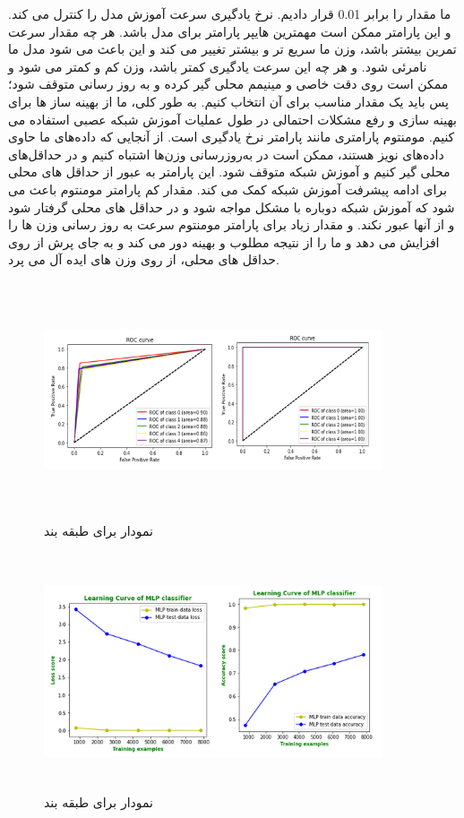\documentclass[12pt,onecolumn,a4paper]{article}
\begin{document}
ما مقدار  را برابر 0.01 قرار دادیم. نرخ یادگیری سرعت آموزش مدل را کنترل می کند. و این پارامتر ممکن است مهمترین هایپر پارامتر برای مدل باشد. هر چه مقدار  سرعت تمرین بیشتر باشد، وزن ما سریع تر و بیشتر تغییر می کند و این باعث می شود مدل ما نامرئی شود. و هر چه این سرعت یادگیری کمتر باشد، وزن کم و کمتر می شود و ممکن است روی دقت خاصی و مینیمم محلی گیر کرده و به روز رسانی متوقف شود؛ پس باید یک مقدار مناسب برای آن انتخاب کنیم.
به طور کلی، ما از بهینه ساز ها برای بهینه سازی و رفع مشکلات احتمالی در طول عملیات آموزش شبکه عصبی استفاده می کنیم. مومنتوم پارامتری مانند پارامتر نرخ یادگیری است.
از آنجایی که داده‌های ما حاوی داده‌های نویز هستند، ممکن است در به‌روزرسانی وزن‌ها اشتباه کنیم و در حداقل‌های محلی گیر کنیم و آموزش شبکه متوقف شود. این پارامتر به عبور از حداقل های محلی برای ادامه پیشرفت آموزش شبکه کمک می کند. مقدار کم پارامتر مومنتوم باعث می شود که آموزش شبکه دوباره با مشکل مواجه شود و در حداقل های محلی گرفتار شود و از آنها عبور نکند. و مقدار زیاد برای پارامتر مومنتوم سرعت به روز رسانی وزن ها را افزایش می دهد و ما را از نتیجه مطلوب و بهینه دور می کند و به جای پرش از روی حداقل های محلی، از روی وزن های ایده آل می پرد.


\begin{figure}
  \centering
  \includegraphics[width=10cm,height=7cm,keepaspectratio]{15.png}
  \caption{نمودار  برای طبقه بند }
  \label{fig:ROCMLP}
\end{figure}

\begin{figure}
  \centering
  \includegraphics[width=10cm,height=7cm,keepaspectratio]{16.png}
  \caption{نمودار  برای طبقه بند }
  \label{fig:LCMLP}
\end{figure}
\end{document}
